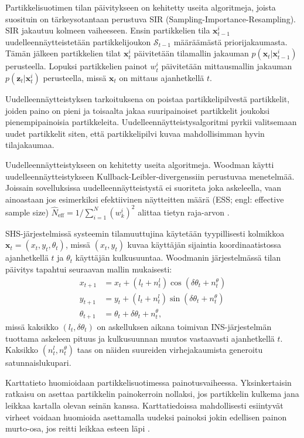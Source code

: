 Partikkelisuotimen tilan päivitykseen on kehitetty useita algoritmeja, joista
suosituin on tärkeysotantaan perustuva SIR
(Sampling\hyp{}Importance\hyp{}Resampling). SIR jakautuu kolmeen vaiheeseen.
Ensin partikkelien tila $\mathbf{x}_{t-1}^i$ uudelleennäytteistetään
partikkelijoukon $\mathcal{S}_{t-1}$ määräämästä priorijakaumasta. Tämän
jälkeen partikkelien tilat $\mathbf{x}_t^i$ päivitetään tilamallin jakauman
$p(\mathbf{x}_t | \mathbf{x}_{t-1}^i)$ perusteella. Lopuksi partikkelien painot
$w_t^i$ päivitetään mittausmallin jakauman $p(\mathbf{z}_t | \mathbf{x}_t^i)$
perusteella, missä $\mathbf{x}_t$ on mittaus ajanhetkellä $t$.

Uudelleennäytteistyksen tarkoituksena on poistaa partikkelipilvestä
partikkelit, joiden paino on pieni ja toisaalta jakaa suuripainoiset
partikkelit joukoksi pienempipainoisia partikkeleita.
Uudelleennäytteistysalgoritmi pyrkii valitsemaan uudet partikkelit siten, että
partikkelipilvi kuvaa mahdollisimman hyvin tilajakaumaa.

Uudelleennäytteistykseen on kehitetty useita algoritmeja.  Woodman
\cite{woodman2008} käytti uudelleennäytteistykseen
Kullback-Leibler-divergenssiin perustuvaa menetelmää. Joissain sovelluksissa
uudelleennäytteistystä ei suoriteta joka askeleella, vaan ainoastaan jos
esimerkiksi efektiivinen näytteitten määrä (ESS; engl: effective sample size)
$\hat{N}_{\text{eff}} = 1 / \sum_{i=1}^N (w_k^i)^2$ alittaa tietyn raja-arvon
\cite{fadjukoff2013}.

SHS-järjestelmissä systeemin tilamuuttujina käytetään tyypillisesti kolmikkoa
$\mathbf{x}_t = (x_t, y_t, \theta_t)$, missä $(x_t, y_t)$ kuvaa käyttäjän
sijaintia koordinaatistossa ajanhetkellä $t$ ja $\theta_t$ käyttäjän
kulkusuuntaa.  Woodmanin \cite{woodman2008} järjestelmässä tilan päivitys
tapahtui seuraavan mallin mukaisesti:
\begin{align}
  x_{t+1}       &= x_t + (l_t + n_t^l) \cos(\delta\theta_t + n_t^\theta) \\
  y_{t+1}       &= y_t + (l_t + n_t^l) \sin(\delta\theta_t + n_t^\theta) \\
  \theta_{t+1}  &= \theta_t + \delta\theta_t + n_t^\theta,
\end{align}
missä kaksikko $(l_t, \delta\theta_t)$ on askelluksen aikana toimivan
INS-järjestelmän tuottama askeleen pituus ja kulkusuunnan muutos vastaavasti
ajanhetkellä $t$. Kaksikko $(n_t^l, n_t^\theta)$ taas on näiden suureiden
virhejakaumista generoitu satunnaislukupari.

Karttatieto huomioidaan partikkelisuotimessa painotusvaiheessa. Yksinkertaisin
ratkaisu on asettaa partikkelin painokerroin nollaksi, jos partikkelin kulkema
jana leikkaa kartalla olevan seinän kanssa. Karttatiedoissa mahdollisesti
esiintyvät virheet voidaan huomioida asettamalla uudeksi painoksi jokin
edellisen painon murto-osa, jos reitti leikkaa esteen läpi
\cite{fadjukoff2013}.

